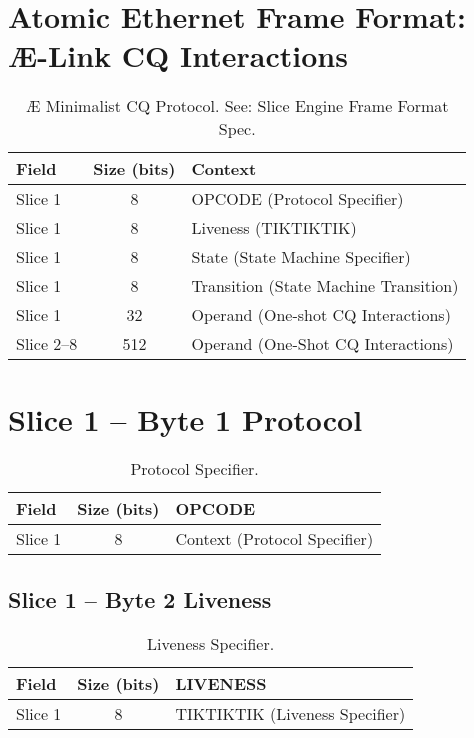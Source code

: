 \documentclass[../../../OAE-SPEC-MAIN.tex]{subfiles}
\begin{document}
\section{Atomic Ethernet Frame Format: Æ-Link CQ Interactions}


\begin{table}[h]
\centering
\begin{tabular}{|l|c|l|}
\hline
\textbf{Field} & \textbf{Size (bits)} & \textbf{Context} \\
\hline
Slice 1 & 8 & OPCODE (Protocol Specifier) \\
Slice 1 & 8 & Liveness (TIKTIKTIK) \\
Slice 1 & 8 & State (State Machine Specifier) \\
Slice 1 & 8 & Transition (State Machine Transition) \\
Slice 1 & 32 & Operand (One-shot CQ Interactions) \\
\hline
Slice 2--8 & 512 & Operand (One-Shot CQ Interactions) \\
\hline
\end{tabular}
\caption{\AE{} Minimalist CQ Protocol. See: Slice Engine Frame Format Spec.}
\label{tab:cq-protocol}
\end{table}
\vspace{20pt}

\section{Slice 1 -- Byte 1 Protocol}

\begin{table}[h]
\centering
\begin{tabular}{|l|c|l|}
\hline
\textbf{Field} & \textbf{Size (bits)} & \textbf{OPCODE} \\
\hline
Slice 1 & 8 & Context (Protocol Specifier) \\
\hline
\end{tabular}
\caption{Protocol Specifier.}
\label{tab:protocol-spec}
\end{table}
\vspace{20pt}

\subsection{Slice 1 -- Byte 2 Liveness}

\begin{table}[h]
\centering
\begin{tabular}{|l|c|l|}
\hline
\textbf{Field} & \textbf{Size (bits)} & \textbf{LIVENESS} \\
\hline
Slice 1 & 8 & TIKTIKTIK (Liveness Specifier) \\
\hline
\end{tabular}
\caption{Liveness Specifier.}
\label{tab:liveness-spec}
\end{table}
\end{document}
